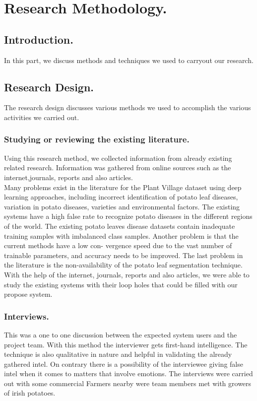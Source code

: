 \documentclass[11pt]{report}
\begin{document}
\newpage
\chapter{Research Methodology.}
\section{Introduction.}
In this part, we discuss methods and techniques we used to carryout our research.\\


\section{Research Design.}
The research design discusses various methods we used to accomplish the various activities we carried out.\\


\subsection{Studying or reviewing the existing literature.}
Using this research method, we collected information from already existing related research. Information was gathered from online sources such as the internet,journals, reports and also articles.\\

Many problems exist in the literature for the Plant Village dataset using deep learning approaches,
including incorrect identification of potato leaf diseases, variation in potato diseases, varieties and
environmental factors. The existing systems have a high false rate to recognize potato diseases in the
different regions of the world. The existing potato leaves disease datasets contain inadequate training
samples with imbalanced class samples. Another problem is that the current methods have a low con-
vergence speed due to the vast number of trainable parameters, and accuracy needs to be improved.
The last problem in the literature is the non-availability of the potato leaf segmentation technique.\\

With the help of the internet, journals, reports and also articles, we were able to study the existing systems with their loop holes that could be filled with our propose system.\\ 

\subsection{Interviews.}
This was a one to one discussion between the expected system users and the project team. With this
method the interviewer gets first-hand intelligence. The technique is also qualitative in nature and
helpful in validating the already gathered intel. On contrary there is a possibility of the interviewee
giving false intel when it comes to matters that involve emotions. The interviews were carried out
with some commercial Farmers nearby were team members met with growers of irish potatoes.\\
\end{document}
